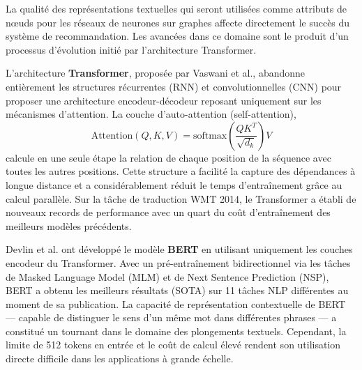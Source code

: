 La qualité des représentations textuelles qui seront utilisées comme attributs de n\oe uds pour les réseaux de neurones sur graphes affecte directement le succès du système de recommandation. Les avancées dans ce domaine sont le produit d'un processus d'évolution initié par l'architecture Transformer.

L'architecture \textbf{Transformer}, proposée par Vaswani et al.\@ \cite{vaswani2017attention}, abandonne entièrement les structures récurrentes (RNN) et convolutionnelles (CNN) pour proposer une architecture encodeur-décodeur reposant uniquement sur les mécanismes d'attention. La couche d'auto-attention (self-attention),
\[
    \text{Attention}(Q, K, V) = \text{softmax}\!\left(\frac{QK^T}{\sqrt{d_k}}\right)V
\]
calcule en une seule étape la relation de chaque position de la séquence avec toutes les autres positions. Cette structure a facilité la capture des dépendances à longue distance et a considérablement réduit le temps d'entraînement grâce au calcul parallèle. Sur la tâche de traduction WMT 2014, le Transformer a établi de nouveaux records de performance avec un quart du coût d'entraînement des meilleurs modèles précédents.

Devlin et al.\@ \cite{devlin2019bert} ont développé le modèle \textbf{BERT} en utilisant uniquement les couches encodeur du Transformer. Avec un pré-entraînement bidirectionnel via les tâches de Masked Language Model (MLM) et de Next Sentence Prediction (NSP), BERT a obtenu les meilleurs résultats (SOTA) sur 11 tâches NLP différentes au moment de sa publication. La capacité de représentation contextuelle de BERT --- capable de distinguer le sens d'un même mot dans différentes phrases --- a constitué un tournant dans le domaine des plongements textuels. Cependant, la limite de 512 tokens en entrée et le coût de calcul élevé rendent son utilisation directe difficile dans les applications à grande échelle.

